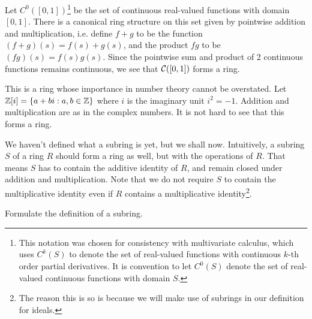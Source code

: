 \documentclass[./main.tex]{subfiles}
\begin{document}
\begin{example}
    Let $C^0([0,1])$\footnote{This notation was chosen for consistency with
    multivariate calculus, which uses $C^k(S)$ to denote the set of real-valued
    functions with continuous $k$-th order partial derivatives. It is convention
    to let $C^0(S)$ denote the set of real-valued continuous functions with
    domain $S$.} be the set of continuous real-valued functions with domain
    $[0,1]$. There is a canonical ring structure on this set given by pointwise
    addition and multiplication, i.e. define $f+g$ to be the function $(f+g)(s)
    = f(s) + g(s)$, and the product $fg$ to be $(fg)(s) = f(s) g(s)$. Since the
    pointwise sum and product of 2 continuous functions remains continuous, we
    see that $\mathcal{C}([0,1])$ forms a ring.
\end{example}

\begin{example}
    This is a ring whose importance in number theory cannot be overstated. Let
    $\mathbb{Z}[i] = \{ a + bi: a, b \in \mathbb{Z} \}$ where $i$ is the imaginary unit $i^2 =
    -1$. Addition and multiplication are as in the complex numbers. It is not
    hard to see that this forms a ring. 
\end{example}

We haven't defined what a subring is yet, but we shall now. Intuitively, a
subring $S$ of a ring $R$ should form a ring as well, but with the operations of
$R$. That means $S$ has to contain the additive identity of $R$, and remain
closed under addition and multiplication. Note that we do not require $S$ to
contain the multiplicative identity even if $R$ contains a multiplicative
identity\footnote{The reason this is so is because we will make use of subrings
in our definition for ideals.}.

\begin{exercise}
    Formulate the definition of a subring.
\end{exercise}
\end{document}
